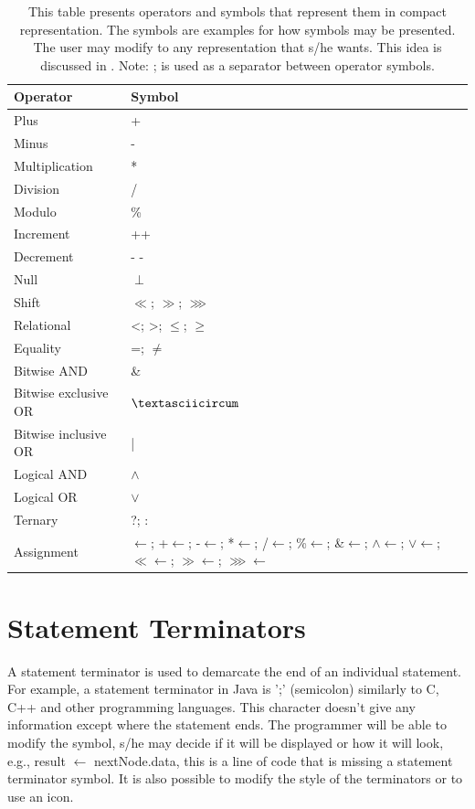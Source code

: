 \begin{table}[H]
	\centering
	\begin{tabular}{|l|l|}
		\hline
		{\bf Operator} & {\bf Symbol} \\ \hline
		Plus & + \\ \hline
		Minus & - \\ \hline
		Multiplication & * \\ \hline
		Division & / \\ \hline
		Modulo & \% \\ \hline
		Increment & ++ \\ \hline
		Decrement & - - \\ \hline
		Null & $ \perp $ \\ \hline
		Shift & $ \ll $; $ \gg $; $ \ggg $ \\ \hline
		Relational & <; >; $ \leq $; $ \geq $ \\ \hline
		Equality & =; $ \neq $ \\ \hline
		Bitwise AND & \& \\ \hline
		Bitwise exclusive OR & $ \textasciicircum $ \\ \hline
		Bitwise inclusive OR & | \\ \hline
		Logical AND & $ \wedge $  \\ \hline
		Logical OR & $ \vee $  \\ \hline
		Ternary & ?; : \\ \hline
		Assignment & $ \longleftarrow $; +$ \longleftarrow $; -$ \longleftarrow $; *$ \longleftarrow $; /$ \longleftarrow $; \%$ \longleftarrow $; \&$ \longleftarrow $; $ \wedge $$ \longleftarrow $; $ \vee $$ \longleftarrow $; $ \ll $$ \longleftarrow $; $ \gg $$ \longleftarrow $; $ \ggg $$ \longleftarrow $\\ \hline
	\end{tabular}
	\caption{This table presents operators and symbols that represent them in compact representation. The symbols are examples for how symbols may be presented. The user may modify to any representation that s/he wants. This idea is discussed in . Note: ; is used as a separator between operator symbols.}
	\label{tab12}
\end{table}
\section{Statement Terminators}
A statement terminator is used to demarcate the end of an individual statement. For example, a statement terminator in Java is ';' (semicolon) similarly to C, C++ and other programming languages. This character doesn't give any information except where the statement ends. The programmer will be able to modify the symbol, s/he may decide if it will be displayed or how it will look, e.g., result $ \longleftarrow $ nextNode.data, this is a line of code that is missing a statement terminator symbol. It is also possible to modify the style of the terminators or to use an icon.
